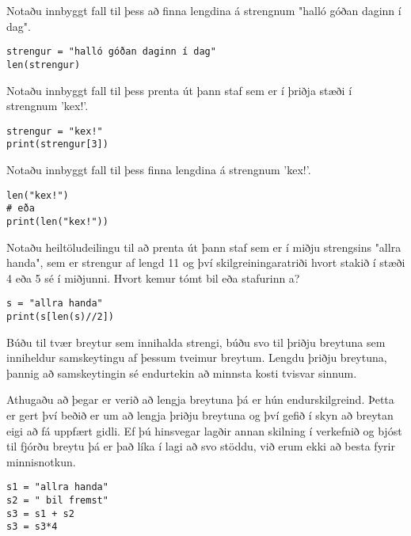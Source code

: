 \begin{exercise}\label{str3}
	Notaðu innbyggt fall til þess að finna lengdina á strengnum "halló góðan daginn í dag".
\end{exercise}
\begin{Answer}[ref={str3}]
	\begin{lstlisting}
strengur = "halló góðan daginn í dag"
len(strengur)\end{lstlisting}
\end{Answer}

\begin{exercise}\label{str4}
	Notaðu innbyggt fall til þess prenta út þann staf sem er í þriðja stæði í strengnum 'kex!'.
\end{exercise}
\begin{Answer}[ref={str4}]
\begin{lstlisting}
strengur = "kex!"
print(strengur[3])\end{lstlisting}
\end{Answer}

\begin{exercise}\label{str4-5}
	Notaðu innbyggt fall til þess finna lengdina á strengnum 'kex!'.
\end{exercise}
\begin{Answer}[ref={str4-5}]
\begin{lstlisting}
len("kex!")
# eða
print(len("kex!"))\end{lstlisting}
\end{Answer}

\begin{exercise}\label{str5}
	Notaðu heiltöludeilingu til að prenta út þann staf sem er í miðju strengsins "allra handa", sem er strengur af lengd 11 og því skilgreiningaratriði hvort stakið í stæði 4 eða 5 sé í miðjunni.
	Hvort kemur tómt bil eða stafurinn a?
\end{exercise}
\begin{Answer}[ref={str5}]
\begin{lstlisting}
s = "allra handa"
print(s[len(s)//2])\end{lstlisting}
\end{Answer}

\begin{exercise}\label{str6}
	Búðu til tvær breytur sem innihalda strengi, búðu svo til þriðju breytuna sem inniheldur samskeytingu af þessum tveimur breytum.
	Lengdu þriðju breytuna, þannig að samskeytingin sé endurtekin að minnsta kosti tvisvar sinnum.
\end{exercise}
\begin{Answer}[ref={str6}]
	Athugaðu að þegar er verið að lengja breytuna þá er hún endurskilgreind.
	Þetta er gert því beðið er um að lengja þriðju breytuna og því gefið í skyn að breytan eigi að fá uppfært gidli.
	Ef þú hinsvegar lagðir annan skilning í verkefnið og bjóst til fjórðu breytu þá er það líka í lagi að svo stöddu, við erum ekki að besta fyrir minnisnotkun.
\begin{lstlisting}
s1 = "allra handa"
s2 = " bil fremst"
s3 = s1 + s2
s3 = s3*4\end{lstlisting}
\end{Answer}

